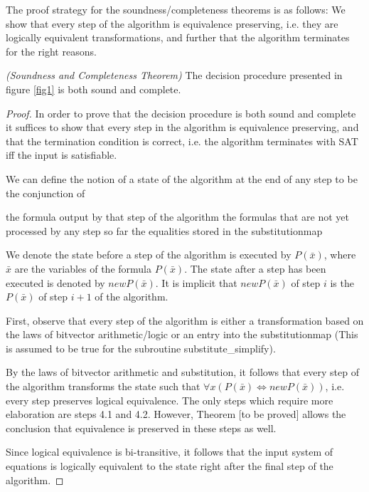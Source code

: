 The proof strategy for the soundness/completeness theorems is as
follows: We show that every step of the algorithm is equivalence
preserving, i.e. they are logically equivalent transformations, and
further that the algorithm terminates for the right reasons.

\begin{theorem}
\emph{(Soundness and Completeness Theorem)}
\label{SoundComplete}
The decision procedure presented in figure \ref{fig1} is both sound
and complete.
\end{theorem}

\begin{proof}
In order to prove that the decision procedure is both sound and
complete it suffices to show that every step in the algorithm is
equivalence preserving, and that the termination condition is
correct, i.e. the algorithm terminates with SAT iff the input is
satisfiable.

We can define the notion of a state of the algorithm at the end of any
step to be the conjunction of
\begin{item}
the formula output by that step of the algorithm
the formulas that are not yet processed by any step so far
the equalities stored in the substitutionmap
\end{item}

We denote the state before a step of the algorithm is executed by
$P(\bar{x})$, where $\bar{x}$ are the variables of the formula
$P(\bar{x})$. The state after a step has been executed is denoted by
$newP(\bar{x})$. It is implicit that $newP(\bar{x})$ of step $i$ is
the $P(\bar{x})$ of step $i+1$ of the algorithm.

First, observe that every step of the algorithm is either a
transformation based on the laws of bitvector arithmetic/logic or an
entry into the substitutionmap (This is assumed to be true for the
subroutine substitute\_simplify). 

By the laws of bitvector arithmetic and substitution, it follows that
every step of the algorithm transforms the state such that $\forall
x(P(\bar{x}) \iff newP(\bar{x}))$, i.e. every step preserves logical
equivalence. The only steps which require more elaboration are steps
4.1 and 4.2. However, Theorem [to be proved] allows the conclusion
that equivalence is preserved in these steps as well.

Since logical equivalence is bi-transitive, it follows that the input
system of equations is logically equivalent to the state right after
the final step of the algorithm.


\end{proof}
